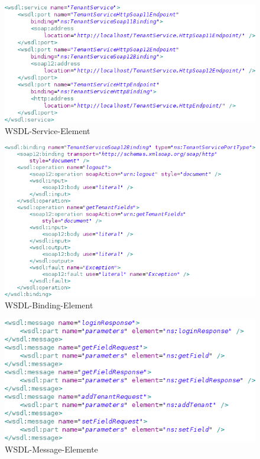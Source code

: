 \documentclass[runningheads]{llncs}
\begin{document}
    \begin{figure}[ht!]
      \centering
      \includegraphics[width=\textwidth]{../images/wsdl_service.png}
      \caption{WSDL-Service-Element}
      \label{fig:wsdl_service}
    \end{figure}

    \begin{figure}[ht!]
      \centering
      \includegraphics[width=\textwidth]{../images/wsdl_binding.png}
      \caption{WSDL-Binding-Element}
      \label{fig:wsdl_binding}
    \end{figure}

    \begin{figure}[ht!]
      \centering
      \includegraphics[width=\textwidth]{../images/wsdl_message.png}
      \caption{WSDL-Message-Elemente}
      \label{fig:wsdl_messages}
    \end{figure}
\end{document}
